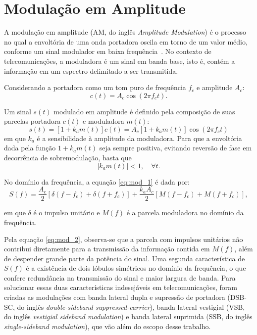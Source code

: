 \section{Modulação em Amplitude}
A modulação em amplitude (AM, do inglês
\textit{Amplitude Modulation}) é o processo no qual a envoltória de uma onda
portadora oscila em torno de um valor médio, conforme um sinal modulador em
baixa frequência~\cite{haykin2008}. No contexto de telecomunicações, a
moduladora é um sinal em banda base, isto é, contém a informação em um espectro
delimitado a ser transmitida.

Considerando a portadora como um tom puro de frequência $f_c$ e amplitude $A_c$:
\begin{equation}
    c(t) = A_c \cos(2\pi f_c t).
\end{equation}

    Um sinal $s(t)$ modulado em amplitude é definido pela composição de suas
parcelas portadora $c(t)$ e moduladora $m(t)$:
\begin{equation}
    s(t) = [1+k_a m(t)]c(t) = A_c[1+k_a m(t)]\cos(2\pi f_c t) \label{eq:mod_1}
\end{equation}
em que $k_a$ é a sensibilidade à amplitude da moduladora. Para que a envoltória
dada pela função $1+k_a m(t)$ seja sempre positiva, evitando reversão de fase em
decorrência de sobremodulação, basta que
\begin{equation}
    |k_a m(t)| < 1, \quad \forall t.
\end{equation}

No domínio da frequência, a equação \eqref{eq:mod_1} é dada por:
\begin{equation}
    S(f) = \frac{A_c}{2} [\delta (f - f_c) + \delta(f + f_c)] + \frac{k_a A_c}{2} [M(f - f_c) + M (f + f_c)], \label{eq:mod_2}
\end{equation}

em que $\delta$ é o impulso unitário e $M(f)$ é a parcela moduladora no domínio
da frequência.

Pela equação \eqref{eq:mod_2}, observa-se que a parcela com impulsos unitários
não contribui diretamente para a transmissão da informação contida em $M(f)$,
além de despender grande parte da potência do sinal. Uma segunda característica
de $S(f)$ é a existência de dois lóbulos simétricos no domínio da
frequência, o que confere redundância na transmissão do sinal e maior largura de
banda. Para solucionar essas duas características indesejáveis em
telecomunicações, foram criadas as modulações com banda lateral dupla e
supressão de portadora (DSB-SC, do inglês \textit{double-sideband
suppressed-carrier}), banda lateral vestigial (VSB, do inglês \textit{vestigial
sideband modulation}) e banda lateral suprimida (SSB, do inglês
\textit{single-sideband modulation}), que vão além do escopo desse trabalho.


